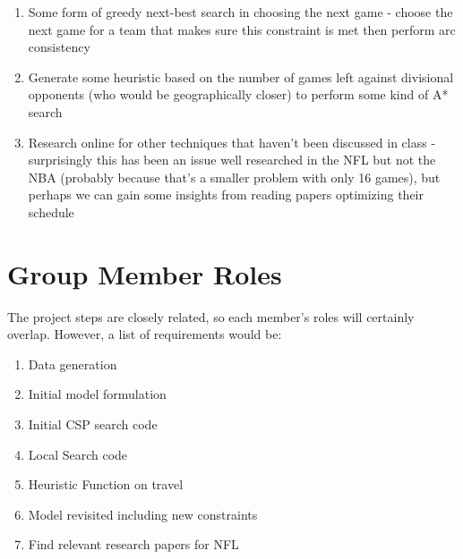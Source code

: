 \documentclass{article}
\begin{document}
	\begin{enumerate}
		\item Some form of greedy next-best search in choosing the next game - choose the next game for a team that makes sure this constraint is met then perform arc consistency
		\item Generate some heuristic based on the number of games left against divisional opponents (who would be geographically closer) to perform some kind of A* search
		\item Research online for other techniques that haven't been discussed in class - surprisingly this has been an issue well researched in the NFL but not the NBA (probably because that's a smaller problem with only 16 games), but perhaps we can gain some insights from reading papers optimizing their schedule
	\end{enumerate}

	\section{Group Member Roles}
	The project steps are closely related, so each member's roles will certainly overlap. However, a list of requirements would be:

	\begin{enumerate}
		\item Data generation
		\item Initial model formulation
		\item Initial CSP search code
		\item Local Search code
		\item Heuristic Function on travel
		\item Model revisited including new constraints
		\item Find relevant research papers for NFL
	\end{enumerate}
	
\end{document}
